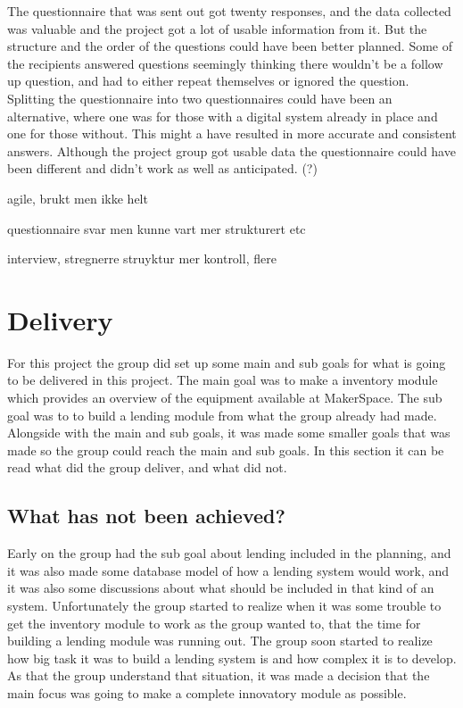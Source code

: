 The questionnaire that was sent out got twenty responses, and the data collected was valuable and the project got a lot of usable information from it. But the structure and the order of the questions could have been better planned. Some of the recipients answered questions seemingly thinking there wouldn't be a follow up question, and had to either repeat themselves or ignored the question. Splitting the questionnaire into two questionnaires could have been an alternative, where one was for those with a digital system already in place and one for those without. This might a have resulted in more accurate and consistent answers. Although the project group got usable data the questionnaire could have been different and didn't work as well as anticipated. (?) %

agile, brukt men ikke helt 

questionnaire svar men kunne vart mer strukturert etc

interview, stregnerre struyktur mer kontroll, flere

\section{Delivery}
For this project the group did set up some main and sub goals for what is going to be delivered in this project. The main goal was to make a inventory module which provides an overview of the equipment available at MakerSpace. The sub goal was to to build a lending module from what the group already had made. Alongside with the main and sub goals, it was made some smaller goals that was made so the group could reach the main and sub goals. In this section it can be read what did the group deliver, and what did not.

\subsection{What has not been achieved?}
Early on the group had the sub goal about lending included in the planning, and it was also made some database model of how a lending system would work, and it was also some discussions about what should be included in that kind of an system. Unfortunately the group started to realize when it was some trouble to get the inventory module to work as the group wanted to, that the time for building a lending module was running out. The group soon started to realize how big task it was to build a lending system is and how complex it is to develop. As that the group understand that situation, it was made a decision that the main focus was going to make a complete innovatory module as possible.

